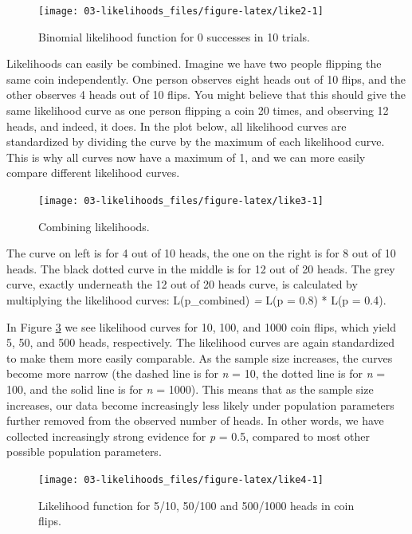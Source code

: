 \documentclass[
]{krantz}
\begin{document}
\begin{figure}

{\centering \texttt{[image: 03-likelihoods\_files/figure-latex/like2-1]} 

}

\caption{Binomial likelihood function for 0 successes in 10 trials.}\label{fig:like2}
\end{figure}

Likelihoods can easily be combined. Imagine we have two people flipping the same coin independently. One person observes eight heads out of 10 flips, and the other observes 4 heads out of 10 flips. You might believe that this should give the same likelihood curve as one person flipping a coin 20 times, and observing 12 heads, and indeed, it does. In the plot below, all likelihood curves are standardized by dividing the curve by the maximum of each likelihood curve. This is why all curves now have a maximum of 1, and we can more easily compare different likelihood curves.

\begin{figure}

{\centering \texttt{[image: 03-likelihoods\_files/figure-latex/like3-1]} 

}

\caption{Combining likelihoods.}\label{fig:like3}
\end{figure}

The curve on left is for 4 out of 10 heads, the one on the right is for 8 out of 10 heads. The black dotted curve in the middle is for 12 out of 20 heads. The grey curve, exactly underneath the 12 out of 20 heads curve, is calculated by multiplying the likelihood curves: L(p\_combined) \emph{=} L(p = 0.8) * L(p = 0.4).

In Figure \ref{fig:like4} we see likelihood curves for 10, 100, and 1000 coin flips, which yield 5, 50, and 500 heads, respectively. The likelihood curves are again standardized to make them more easily comparable. As the sample size increases, the curves become more narrow (the dashed line is for \emph{n} = 10, the dotted line is for \emph{n} = 100, and the solid line is for \emph{n} = 1000). This means that as the sample size increases, our data become increasingly less likely under population parameters further removed from the observed number of heads. In other words, we have collected increasingly strong evidence for \emph{p} = 0.5, compared to most other possible population parameters.

\begin{figure}

{\centering \texttt{[image: 03-likelihoods\_files/figure-latex/like4-1]} 

}

\caption{Likelihood function for 5/10, 50/100 and 500/1000 heads in coin flips.}\label{fig:like4}
\end{figure}
\end{document}
